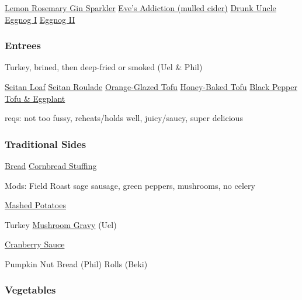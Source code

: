 \begin{centering}
 \href{https://www.seriouseats.com/recipes/2014/11/gin-cocktail-for-crowds-charred-lemon-rosemary-drink-recipe.html}{Lemon Rosemary Gin Sparkler} \blt
 \href{https://www.seriouseats.com/recipes/2013/11/eves-addiction-hot-mulled-cider-recipe.html}{Eve's Addiction (mulled cider)} \blt
 \href{https://www.seriouseats.com/recipes/2016/10/drunk-uncle-scotch-cynar-negroni-cocktail-recipe.html}{Drunk Uncle} \blt
 \hyperref[Eggnog I]{Eggnog I} \blt
 \hyperref[Eggnog II]{Eggnog II}

 \subsubsection*{Entrees}

 Turkey, brined, then deep-fried or smoked (Uel \& Phil)

 \href{http://www.theppk.com/2011/11/seitan-roast-stuffed-with-shiitakes-and-leeks/}{Seitan Loaf} \blt
 \href{https://olivesfordinner.com/2011/11/seitan-roulade-with-sage-and-swee.html}{Seitan Roulade} \blt
 \hyperref[Orange-Glazed Tofu]{Orange-Glazed Tofu} \blt
 \href{https://www.theppk.com/2016/12/sweet-smoky-glazed-tofu-ham/}{Honey-Baked Tofu} \blt
 \href{https://smittenkitchen.com/2019/08/black-pepper-tofu-and-eggplant/}{Black Pepper Tofu \& Eggplant}

 reqs: not too fussy, reheats/holds well, juicy/saucy, super delicious

 \subsubsection*{Traditional Sides}

 \hyperref[Bread Stuffing]{Bread} \blt \href{https://www.seriouseats.com/recipes/2015/11/cornbread-stuffing-sausage-sage-recipe.html}{Cornbread Stuffing}

 Mods: Field Roast sage sausage, green peppers, mushrooms, no celery

 \href{https://www.foodnetwork.com/recipes/alton-brown/creamy-mashed-potatoes-recipe-1956220}{Mashed Potatoes}

 Turkey \blt \href{https://www.kitchentreaty.com/vegetarian-onion-gravy/}{Mushroom Gravy} (Uel)

 \hyperref[Cranberry Sauce]{Cranberry Sauce}

 Pumpkin Nut Bread (Phil) \blt Rolls (Beki)

 \subsubsection*{Vegetables}


\end{centering}
